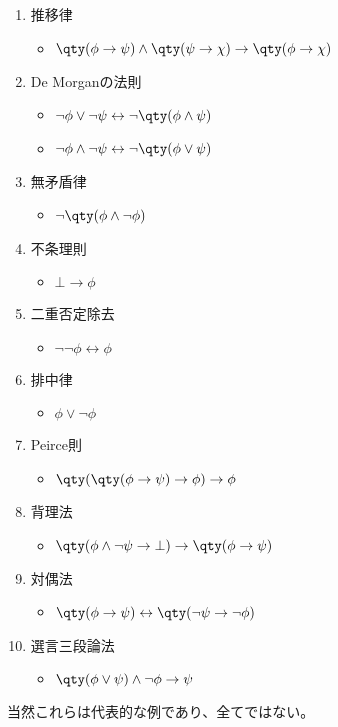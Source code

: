 {\begin{enumerate}
\begin{itemize}
    \end{itemize}
    \item 推移律
    \begin{itemize}
      \item $\qty(\phi \rightarrow \psi) \land \qty(\psi \rightarrow \chi) \rightarrow \qty(\phi \rightarrow \chi)$
    \end{itemize}
    \item De Morganの法則
    \begin{itemize}
      \item $\lnot \phi \lor \lnot \psi \leftrightarrow \lnot \qty(\phi \land \psi)$
      \item $\lnot \phi \land \lnot \psi \leftrightarrow \lnot \qty(\phi \lor \psi)$
    \end{itemize}
    \item 無矛盾律
    \begin{itemize}
      \item $\lnot \qty(\phi \land \lnot \phi)$
    \end{itemize}
    \item 不条理則
    \begin{itemize}
      \item $\bot \rightarrow \phi$
    \end{itemize}
    \item 二重否定除去
    \begin{itemize}
      \item $\lnot \lnot \phi \leftrightarrow \phi$
    \end{itemize}
    \item 排中律
    \begin{itemize}
      \item $\phi \lor \lnot \phi$
    \end{itemize}
    \item Peirce則
    \begin{itemize}
      \item $\qty(\qty(\phi \rightarrow \psi) \rightarrow \phi) \rightarrow \phi$
    \end{itemize}
    \item 背理法
    \begin{itemize}
      \item $\qty(\phi \land \lnot \psi \rightarrow \bot) \rightarrow \qty(\phi \rightarrow \psi)$
    \end{itemize}
    \item 対偶法
    \begin{itemize}
      \item $\qty(\phi \rightarrow \psi) \leftrightarrow \qty(\lnot \psi \rightarrow \lnot \phi)$
    \end{itemize}
    \item 選言三段論法
    \begin{itemize}
      \item $\qty(\phi \lor \psi) \land \lnot \phi \rightarrow \psi$
    \end{itemize}
  \end{enumerate}

  当然これらは代表的な例であり、全てではない。
}


